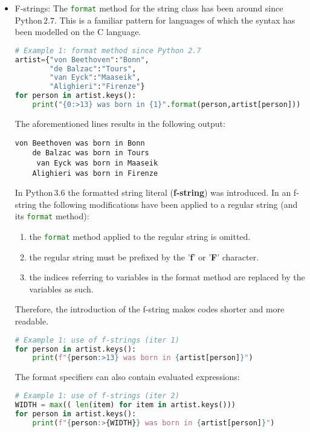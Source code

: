\documentclass[10pt]{article}
\begin{document}
\begin{itemize}
	\item F-strings:\newline		
The \lstinline[language=python]{format} method for the string class 
has been around since Python\,$2.7$. 
This is a familiar pattern for languages of which the syntax has been modelled on
the C language.
\begin{lstlisting}[language=python] 
# Example 1: format method since Python 2.7
artist={"von Beethoven":"Bonn",
        "de Balzac":"Tours",
        "van Eyck":"Maaseik",
        "Alighieri":"Firenze"}
for person in artist.keys():
    print("{0:>13} was born in {1}".format(person,artist[person]))
\end{lstlisting}

The aforementioned lines results in the following output:
\begin{verbatim}
von Beethoven was born in Bonn
    de Balzac was born in Tours
     van Eyck was born in Maaseik
    Alighieri was born in Firenze
\end{verbatim}

In Python\,$3.6$ the formatted string literal (\textbf{f-string}) was introduced.
In an f-string the following modifications have been applied to a regular string (and its \lstinline[language=python]{format} method):
\begin{enumerate}
	\item the \lstinline[language=python]{format} method applied to the regular string is omitted.
	\item the regular string must be prefixed by the '\textbf{f}' or '\textbf{F}' character.
        \item the indices referring to variables in the format method are replaced by the variables as such.	
\end{enumerate}
Therefore, the introduction of the f-string makes codes shorter and more readable.

\begin{lstlisting}[language=python]
# Example 1: use of f-strings (iter 1)
for person in artist.keys():
    print(f"{person:>13} was born in {artist[person]}")
\end{lstlisting} 

The format specifiers can also contain evaluated expressions:
\begin{lstlisting}[language=python]
# Example 1: use of f-strings (iter 2)
WIDTH = max(( len(item) for item in artist.keys()))
for person in artist.keys():
    print(f"{person:>{WIDTH}} was born in {artist[person]}")
\end{lstlisting}



\end{itemize}
\end{document}
